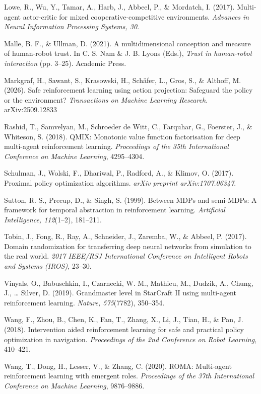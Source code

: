 \documentclass[12pt]{article}      %
\newenvironment{apareferences}
  {\begin{list}{}{%
      \setlength{\leftmargin}{0.5in}%
      \setlength{\itemindent}{-0.5in}%
      \setlength{\listparindent}{-0.5in}%
      \setlength{\itemsep}{0pt}%
      \setlength{\parsep}{0pt}}%
   \raggedright}
  {\end{list}}
\newcommand{\refitem}{\item}
\begin{document}
\begin{apareferences}
\refitem Lowe, R., Wu, Y., Tamar, A., Harb, J., Abbeel, P., \& Mordatch, I.
(2017). Multi-agent actor-critic for mixed cooperative-competitive
environments. \emph{Advances in Neural Information Processing Systems, 30}.

\refitem Malle, B. F., \& Ullman, D. (2021). A multidimensional conception and
measure of human-robot trust. In C. S. Nam \& J. B. Lyons (Eds.),
\emph{Trust in human-robot interaction} (pp. 3--25). Academic Press.

\refitem Markgraf, H., Sawant, S., Krasowski, H., Sch\"afer, L., Gros, S., \&
Althoff, M. (2026). Safe reinforcement learning using action projection:
Safeguard the policy or the environment? \emph{Transactions on Machine
Learning Research}. arXiv:2509.12833

\refitem Rashid, T., Samvelyan, M., Schroeder de Witt, C., Farquhar, G.,
Foerster, J., \& Whiteson, S. (2018). QMIX: Monotonic value function
factorisation for deep multi-agent reinforcement learning. \emph{Proceedings
of the 35th International Conference on Machine Learning}, 4295--4304.

\refitem Schulman, J., Wolski, F., Dhariwal, P., Radford, A., \& Klimov, O.
(2017). Proximal policy optimization algorithms. \emph{arXiv preprint
arXiv:1707.06347}.

\refitem Sutton, R. S., Precup, D., \& Singh, S. (1999). Between MDPs and
semi-MDPs: A framework for temporal abstraction in reinforcement learning.
\emph{Artificial Intelligence, 112}(1--2), 181--211.

\refitem Tobin, J., Fong, R., Ray, A., Schneider, J., Zaremba, W., \& Abbeel,
P. (2017). Domain randomization for transferring deep neural networks from
simulation to the real world. \emph{2017 IEEE/RSJ International Conference on
Intelligent Robots and Systems (IROS)}, 23--30.

\refitem Vinyals, O., Babuschkin, I., Czarnecki, W. M., Mathieu, M., Dudzik,
A., Chung, J., \ldots{} Silver, D. (2019). Grandmaster level in StarCraft II
using multi-agent reinforcement learning. \emph{Nature, 575}(7782), 350--354.

\refitem Wang, F., Zhou, B., Chen, K., Fan, T., Zhang, X., Li, J., Tian, H.,
\& Pan, J. (2018). Intervention aided reinforcement learning for safe and
practical policy optimization in navigation. \emph{Proceedings of the 2nd
Conference on Robot Learning}, 410--421.

\refitem Wang, T., Dong, H., Lesser, V., \& Zhang, C. (2020). ROMA:
Multi-agent reinforcement learning with emergent roles. \emph{Proceedings of
the 37th International Conference on Machine Learning}, 9876--9886.

\end{apareferences}
\end{document}

